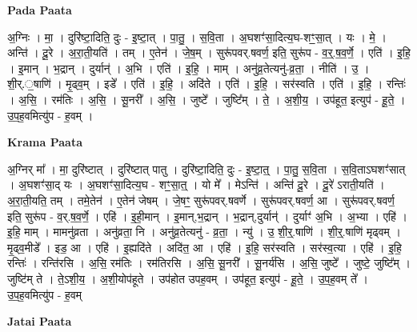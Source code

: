 \documentclass[17pt]{extarticle}
\begin{document}
\textbf{Pada Paata} \newline

अ॒ग्निः । मा॒ । दुरि॑ष्टा॒दिति॒ दुः - इ॒ष्टा॒त् । पा॒तु॒ । स॒वि॒ता । अ॒घशꣳ॑सा॒दित्य॒घ-शꣳ॒॒सा॒त् । यः । मे॒ । अन्ति॑ । दू॒रे । अ॒रा॒ती॒यति॑ । तम् । ए॒तेन॑ । जे॒ष॒म् । सुरू॑पवर्.षवर्ण॒ इति॒ सुरू॑प - व॒र्॒.ष॒व॒र्णे॒ । एति॑ । इ॒हि॒ । इ॒मान् । भ॒द्रान् । दुर्यान्॑ । अ॒भि । एति॑ । इ॒हि॒ । माम् । अनु॑व्र॒तेत्यनु॑-व्र॒ता॒ । नीति॑ । उ॒ । शी॒र्.॒षाणि॑ । मृ॒ढ्व॒म् । इडे᳚ । एति॑ । इ॒हि॒ । अदि॑ते । एति॑ । इ॒हि॒ । सर॑स्वति । एति॑ । इ॒हि॒ । रन्तिः॑ । अ॒सि॒ । रम॑तिः । अ॒सि॒ । सू॒नरी᳚ । अ॒सि॒ । जुष्टे᳚ । जुष्टि᳚म् । ते॒ । अ॒शी॒य॒ । उप॑हूत॒ इत्युप॑ - हू॒ते॒ । उ॒प॒ह॒वमित्यु॑प - ह॒वम् ।  \newline


\textbf{Krama Paata} \newline

अ॒ग्निर् मा᳚ । मा॒ दुरि॑ष्टात् । दुरि॑ष्टात् पातु । दुरि॑ष्टा॒दिति॒ दुः - इ॒ष्टा॒त्॒ । पा॒तु॒ स॒वि॒ता । स॒वि॒ताऽघशꣳ॑सात् । अ॒घशꣳ॑सा॒द् यः । अ॒घशꣳ॑सा॒दित्य॒घ - शꣳ॒॒सा॒त्॒ । यो मे᳚ । मेऽन्ति॑ । अन्ति॑ दू॒रे । दू॒रे॑ ऽराती॒यति॑ । अ॒रा॒ती॒यति॒ तम् । तमे॒तेन॑ । ए॒तेन॑ जेषम् । जे॒षꣳ॒॒ सुरू॑पवर्.षवर्णे । सुरू॑पवर्.षवर्ण॒ आ । सुरू॑पवर्.षवर्ण॒ इति॒ सुरू॑प - व॒र्.ष॒व॒र्णे॒ । एहि॑ । इ॒ही॒मान् । इ॒मान्,भ॒द्रान् । भ॒द्रान्,दुर्यान्॑ । दुर्याꣳ॑ अ॒भि । अ॒भ्या । एहि॑ । इ॒हि॒ माम् । मामनु॑व्रता । अनु॑व्रता॒ नि । अनु॑व्र॒तेत्यनु॑ - व्र॒ता॒ । न्यु॑ । उ॒ शी॒र्॒.षाणि॑ । शी॒र्॒.षाणि॑ मृढ्वम् । मृ॒ढ्व॒मीडे᳚ । इड॒ आ । एहि॑ । इ॒ह्यदि॑ते । अदि॑त॒ आ । एहि॑ । इ॒हि॒ सर॑स्वति । सर॑स्व॒त्या । एहि॑ । इ॒हि॒ रन्तिः॑ । रन्ति॑रसि । अ॒सि॒ रम॑तिः । रम॑तिरसि । अ॒सि॒ सू॒नरी᳚ । सू॒नर्य॑सि । अ॒सि॒ जुष्टे᳚ । जुष्टे॒ जुष्टि᳚म् । जुष्टि॑म् ते । ते॒ऽशी॒य॒ । अ॒शी॒योप॑हूते । उप॑होत उपह॒वम् । उप॑हूत॒ इत्युप॑ - हू॒ते॒ । उ॒प॒ह॒वम् ते᳚ । उ॒प॒ह॒वमित्यु॑प - ह॒वम् \newline

\textbf{Jatai Paata} \newline
\end{document}
